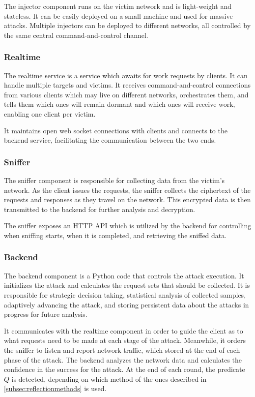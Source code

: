 The injector component runs on the victim network and is
light-weight and stateless. It can be easily deployed on a small machine and
used for massive attacks. Multiple injectors can be deployed to different
networks, all controlled by the same central command-and-control channel.

\subsubsection{Realtime}

The realtime service is a service which awaits for work requests by clients. It
can handle multiple targets and victims. It receives command-and-control
connections from various clients which may live on different networks,
orchestrates them, and tells them which ones will remain dormant and which ones
will receive work, enabling one client per victim.

It maintains open web socket connections with clients and
connects to the backend service, facilitating the communication between the two
ends.

\subsubsection{Sniffer}

The sniffer component is responsible for collecting data from the
victim's network. As the client issues the requests, the sniffer
collects the ciphertext of the requests and responses as they
travel on the network. This encrypted data is then transmitted to the backend
for further analysis and decryption.

The sniffer exposes an HTTP API which is utilized by the backend for controlling
when sniffing starts, when it is completed, and retrieving the sniffed data.

\subsubsection{Backend}

The backend component is a Python code that controls the attack execution. It
initializes the attack and calculates the request sets that should be
collected. It is responsible for strategic decision taking, statistical
analysis of collected samples, adaptively advancing the attack, and storing
persistent data about the attacks in progress for future analysis.

It communicates with the realtime component in order to guide the client as to
what requests need to be made at each stage of the attack. Meanwhile, it orders
the sniffer to listen and report network traffic, which stored
at the end of each phase of the attack. The backend analyzes the
network data and calculates the confidence in the success for the attack. At the
end of each round, the predicate $Q$ is detected, depending on which method of
the ones described
in \ref{subsec:reflectionmethods} is used.

